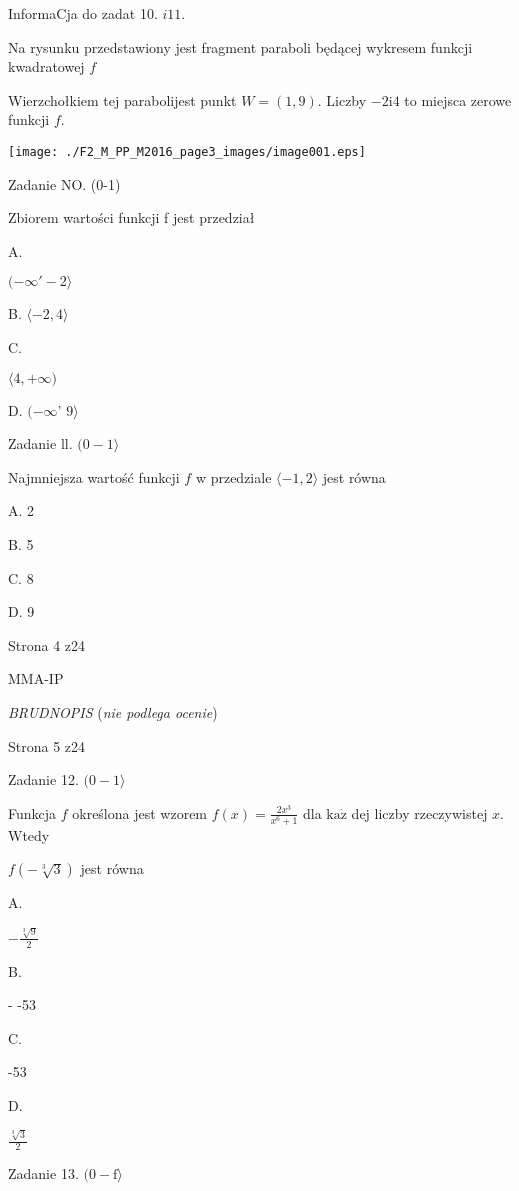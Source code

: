 \documentclass[a4paper,12pt]{article}
\begin{document}
InformaCja do zadat 10. $i11.$

Na rysunku przedstawiony jest fragment paraboli będącej wykresem funkcji kwadratowej $f$

Wierzchołkiem tej parabolijest punkt $W=(1,9)$. Liczby $-2\mathrm{i}4$ to miejsca zerowe funkcji $f.$
\begin{center}
\texttt{[image: ./F2\_M\_PP\_M2016\_page3\_images/image001.eps]}
\end{center}
Zadanie NO. (0-1)

Zbiorem wartości funkcji f jest przedział

A.

$(-\infty'-2\rangle$

B. $\langle-2,  4\rangle$

C.

$\langle 4,+\infty)$

D. $(-\infty$' $ 9\rangle$

Zadanie ll. $(0-1\rangle$

Najmniejsza wartość funkcji $f$ w przedziale $\langle-1,2\rangle$ jest równa

A. 2

B. 5

C. 8

D. 9

Strona 4 z24

MMA-IP





{\it BRUDNOPIS} ({\it nie podlega ocenie})

Strona 5 z24





Zadanie 12. $(0-1\rangle$

Funkcja $f$ określona jest wzorem $f(x)=\displaystyle \frac{2x^{3}}{x^{6}+1}$ dla $\mathrm{k}\mathrm{a}\dot{\mathrm{z}}$ dej liczby rzeczywistej $x$. Wtedy

$f(-\sqrt[3]{3})$ jest równa

A.

$-\displaystyle \frac{\sqrt[3]{9}}{2}$

B.

- -53

C.

-53

D.

$\displaystyle \frac{\sqrt[3]{3}}{2}$

Zadanie 13. $(0-\mathrm{f}\rangle$
\end{document}
